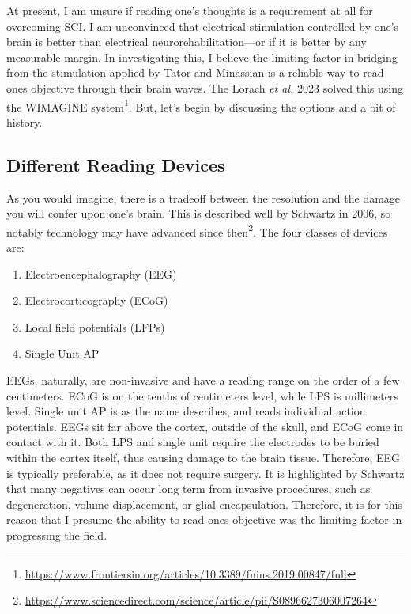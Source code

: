 \documentclass[12pt]{report}
\begin{document}
At present, I am unsure if reading one's thoughts is a requirement at all for overcoming SCI. I am unconvinced that electrical stimulation controlled by one's brain is better than electrical neurorehabilitation---or if it is better by any measurable margin. In investigating this, I believe the limiting factor in bridging from the stimulation applied by Tator and Minassian is a reliable way to read ones objective through their brain waves. The Lorach \textit{et al.} 2023 solved this using the WIMAGINE system\footnote{\url{https://www.frontiersin.org/articles/10.3389/fnins.2019.00847/full}}. But, let's begin by discussing the options and a bit of history.

\subsection{Different Reading Devices} As you would imagine, there is a tradeoff between the resolution and the damage you will confer upon one's brain. This is described well by Schwartz in 2006, so notably technology may have advanced since then\footnote{\url{https://www.sciencedirect.com/science/article/pii/S0896627306007264}}. The four classes of devices are: 
\begin{enumerate}
    \item Electroencephalography (EEG)
    \item Electrocorticography (ECoG)
    \item Local field potentials (LFPs)
    \item Single Unit AP
\end{enumerate}

EEGs, naturally, are non-invasive and have a reading range on the order of a few centimeters. ECoG is on the tenths of centimeters level, while LPS is millimeters level. Single unit AP is as the name describes, and reads individual action potentials. EEGs sit far above the cortex, outside of the skull, and ECoG come in contact with it. Both LPS and single unit require the electrodes to be buried within the cortex itself, thus causing damage to the brain tissue. Therefore, EEG is typically preferable, as it does not require surgery. It is highlighted by Schwartz that many negatives can occur long term from invasive procedures, such as degeneration, volume displacement, or glial encapsulation. Therefore, it is for this reason that I presume the ability to read ones objective was the limiting factor in progressing the field. \newline
\end{document}
